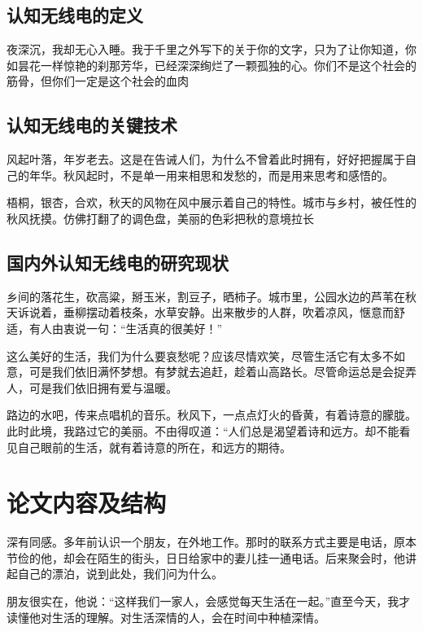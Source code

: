 \documentclass[a4paper,12pt]{report}
\begin{document}
\subsection{认知无线电的定义}
夜深沉，我却无心入睡。我于千里之外写下的关于你的文字，只为了让你知道，你如昙花一样惊艳的刹那芳华，已经深深绚烂了一颗孤独的心。你们不是这个社会的筋骨，但你们一定是这个社会的血肉
\subsection{认知无线电的关键技术}
风起叶落，年岁老去。这是在告诫人们，为什么不曾着此时拥有，好好把握属于自己的年华。秋风起时，不是单一用来相思和发愁的，而是用来思考和感悟的。



梧桐，银杏，合欢，秋天的风物在风中展示着自己的特性。城市与乡村，被任性的秋风抚摸。仿佛打翻了的调色盘，美丽的色彩把秋的意境拉长
\subsection{国内外认知无线电的研究现状}
乡间的落花生，砍高粱，掰玉米，割豆子，晒柿子。城市里，公园水边的芦苇在秋天诉说着，垂柳摆动着枝条，水草安静。出来散步的人群，吹着凉风，惬意而舒适，有人由衷说一句：“生活真的很美好！”



这么美好的生活，我们为什么要哀愁呢？应该尽情欢笑，尽管生活它有太多不如意，可是我们依旧满怀梦想。有梦就去追赶，趁着山高路长。尽管命运总是会捉弄人，可是我们依旧拥有爱与温暖。



路边的水吧，传来点唱机的音乐。秋风下，一点点灯火的昏黄，有着诗意的朦胧。此时此境，我路过它的美丽。不由得叹道：“人们总是渴望着诗和远方。却不能看见自己眼前的生活，就有着诗意的所在，和远方的期待。
\section{论文内容及结构}
深有同感。多年前认识一个朋友，在外地工作。那时的联系方式主要是电话，原本节俭的他，却会在陌生的街头，日日给家中的妻儿挂一通电话。后来聚会时，他讲起自己的漂泊，说到此处，我们问为什么。



朋友很实在，他说：“这样我们一家人，会感觉每天生活在一起。”直至今天，我才读懂他对生活的理解。对生活深情的人，会在时间中种植深情。
\end{document}
